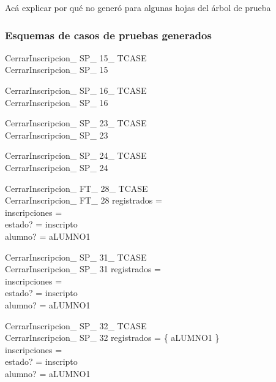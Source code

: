 \documentclass{article}
\begin{document}
Acá explicar por qué no generó para algunas hojas del árbol de prueba

\subsubsection*{Esquemas de casos de pruebas generados}
\begin{schema}{CerrarInscripcion\_ SP\_ 15\_ TCASE}\\
 CerrarInscripcion\_ SP\_ 15
\end{schema}


\begin{schema}{CerrarInscripcion\_ SP\_ 16\_ TCASE}\\
 CerrarInscripcion\_ SP\_ 16
\end{schema}


\begin{schema}{CerrarInscripcion\_ SP\_ 23\_ TCASE}\\
 CerrarInscripcion\_ SP\_ 23
\end{schema}


\begin{schema}{CerrarInscripcion\_ SP\_ 24\_ TCASE}\\
 CerrarInscripcion\_ SP\_ 24
\end{schema}


\begin{schema}{CerrarInscripcion\_ FT\_ 28\_ TCASE}\\
 CerrarInscripcion\_ FT\_ 28 
\where
 registrados =~\emptyset \\
 inscripciones =~\emptyset \\
 estado? = inscripto \\
 alumno? = aLUMNO1
\end{schema}


\begin{schema}{CerrarInscripcion\_ SP\_ 31\_ TCASE}\\
 CerrarInscripcion\_ SP\_ 31 
\where
 registrados =~\emptyset \\
 inscripciones =~\emptyset \\
 estado? = inscripto \\
 alumno? = aLUMNO1
\end{schema}


\begin{schema}{CerrarInscripcion\_ SP\_ 32\_ TCASE}\\
 CerrarInscripcion\_ SP\_ 32 
\where
 registrados = \{ aLUMNO1 \} \\
 inscripciones =~\emptyset \\
 estado? = inscripto \\
 alumno? = aLUMNO1
\end{schema}
\end{document}
